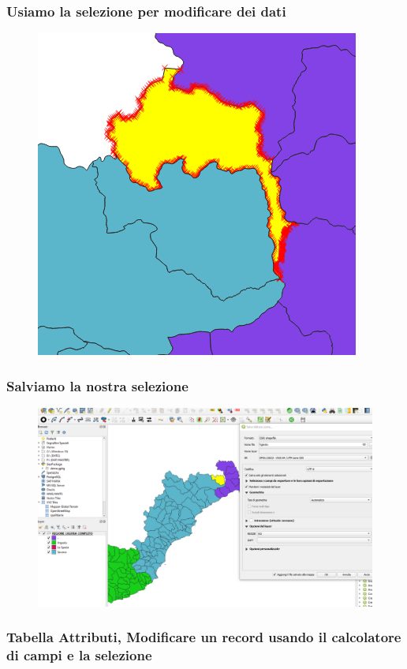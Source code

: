 \documentclass{beamer}
\begin{document}
{\begin{frame}
\begin{figure}
       
   \end{figure}
		    
\end{frame}


\begin{frame}
   \frametitle{Usiamo la selezione per modificare dei dati}
   \begin{figure}
       \centering
        \includegraphics[width=0.5\linewidth]{tiglietto2.png}
        
   \end{figure}
\end{frame}

\begin{frame}
   \frametitle{Salviamo la nostra selezione}
   \begin{figure}
       \centering
       \includegraphics[width=0.75\linewidth]{tiglietto 3.png}
       
       \label{fig:enter-label}
   \end{figure}
\end{frame}




\begin{frame}
   \frametitle{Tabella Attributi, Modificare un record usando il calcolatore di campi e la selezione}
  

\end{frame}}
\end{document}
